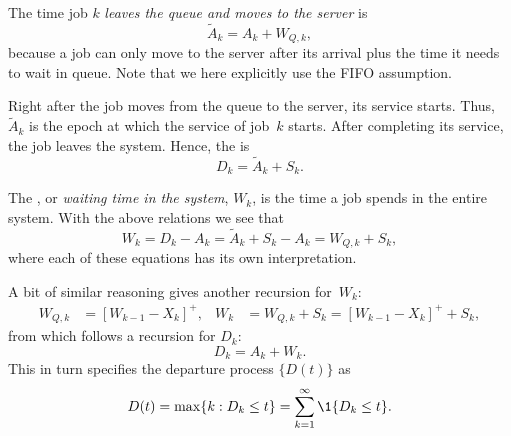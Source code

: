 The time job $k$ \emph{leaves the queue and moves to the server} is
\begin{equation*}
 \tilde A_k = A_k + W_{Q,k},
\end{equation*}
because a job can only move to the server after its arrival plus the
time it needs to wait in queue.  Note that we here explicitly use the
FIFO assumption.

Right after the job moves from the queue to the server, its service starts.  Thus,~$\tilde A_{k}$ is the epoch at which the service of job~$k$ starts. After completing its service,
the job leaves the system. Hence, the  is
\begin{equation*}
  D_k = \tilde A_{k} + S_k.
\end{equation*}

The , or \emph{waiting time in the system}, $W_k$, is the
time a job spends in the entire system. With the above relations we
see that
\begin{equation}
  W_k = D_k - A_k = \tilde A_{k} + S_k -A_k = W_{Q,k} + S_k,
\end{equation}
where each of these equations has its own interpretation. 

A bit of similar reasoning gives another recursion for~$W_k$:
\begin{align}
  \label{eq:59}
  W_{Q,k} &= [W_{k-1} - X_k]^+, &
  W_{k} &= W_{Q,k} + S_k = [W_{k-1} - X_k]^+ + S_k,
\end{align}
from which follows a recursion for $D_k$:
\begin{equation}
  D_k = A_k + W_k.
\end{equation}
This in turn specifies the departure process $\{D(t)\}$ as
\begin{equation*}
  D(t) = \max\{k : D_k \leq t\} = \sum_{k=1}^\infty \1{D_k \leq t}.
\end{equation*}

